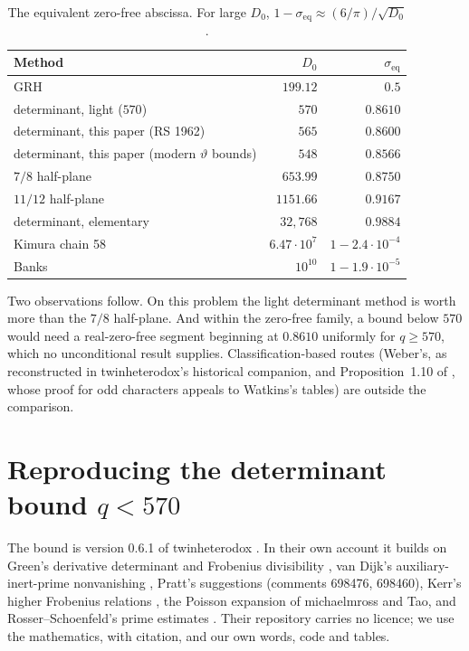 \documentclass[11pt]{article}
\theoremstyle{definition}
\begin{document}
\begin{table}[ht]\centering\small
\begin{tabular}{@{}lrr@{}}\toprule
Method & $D_0$ & $\sigma_{\mathrm{eq}}$\\\midrule
GRH & $199.12$ & $0.5$\\
determinant, light ($570$) & $570$ & $0.8610$\\
determinant, this paper (RS 1962) & $565$ & $0.8600$\\
determinant, this paper (modern $\vartheta$ bounds) & $548$ & $0.8566$\\
$7/8$ half-plane & $653.99$ & $0.8750$\\
$11/12$ half-plane & $1151.66$ & $0.9167$\\
determinant, elementary & $32{,}768$ & $0.9884$\\
Kimura chain 58 & $6.47\cdot10^7$ & $1 - 2.4\cdot10^{-4}$\\
Banks & $10^{10}$ & $1 - 1.9\cdot10^{-5}$\\\bottomrule
\end{tabular}
\caption{The equivalent zero-free abscissa. For large $D_0$, $1 - \sigma_{\mathrm{eq}} \approx (6/\pi)/\sqrt{D_0}$.}\label{tab:scale}
\end{table}

Two observations follow. On this problem the light determinant method is worth more than the $7/8$ half-plane. And within the zero-free family, a bound below $570$ would need a real-zero-free segment beginning at $0.8610$ uniformly for $q \ge 570$, which no unconditional result supplies. Classification-based routes (Weber's, as reconstructed in twinheterodox's historical companion, and Proposition~1.10 of \cite{BMOR2018}, whose proof for odd characters appeals to Watkins's tables) are outside the comparison.

\section{Reproducing the determinant bound \texorpdfstring{$q < 570$}{q < 570}}\label{sec:reproduction}
The bound is version 0.6.1 of twinheterodox \cite{twinheterodox}. In their own account it builds on Green's derivative determinant and Frobenius divisibility \cite{Green2026}, van Dijk's auxiliary-inert-prime nonvanishing \cite{vanDijk2026}, Pratt's suggestions (comments 698476, 698460), Kerr's higher Frobenius relations \cite{Kerr2026}, the Poisson expansion of michaelmross and Tao, and Rosser--Schoenfeld's prime estimates \cite{RS1962}. Their repository carries no licence; we use the mathematics, with citation, and our own words, code and tables.
\end{document}
